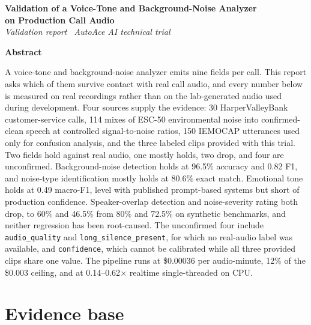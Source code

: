 \documentclass[11pt]{article}
\begin{document}
\begin{center}
{\LARGE\bfseries Validation of a Voice-Tone and Background-Noise Analyzer\\[3pt] on Production Call Audio}\\[7pt]
{\small\itshape\color{ink} Validation report \textperiodcentered\ AutoAce AI technical trial}
\end{center}
\vspace{2pt}
\noindent{\color{linecol}\rule{\textwidth}{0.6pt}}
\vspace{4pt}

\begin{center}\small\bfseries Abstract\end{center}
\small
\noindent\hspace{1.5em}A voice-tone and background-noise analyzer emits nine fields per call. This report asks which of them survive contact with real call audio, and every number below is measured on real recordings rather than on the lab-generated audio used during development. Four sources supply the evidence: 30 HarperValleyBank customer-service calls, 114 mixes of ESC-50 environmental noise into confirmed-clean speech at controlled signal-to-noise ratios, 150 IEMOCAP utterances used only for confusion analysis, and the three labeled clips provided with this trial. Two fields hold against real audio, one mostly holds, two drop, and four are unconfirmed. Background-noise detection holds at 96.5\% accuracy and 0.82 F1, and noise-type identification mostly holds at 80.6\% exact match. Emotional tone holds at 0.49 macro-F1, level with published prompt-based systems but short of production confidence. Speaker-overlap detection and noise-severity rating both drop, to 60\% and 46.5\% from 80\% and 72.5\% on synthetic benchmarks, and neither regression has been root-caused. The unconfirmed four include \texttt{audio\_quality} and \texttt{long\_\allowbreak silence\_\allowbreak present}, for which no real-audio label was available, and \texttt{confidence}, which cannot be calibrated while all three provided clips share one value. The pipeline runs at \$0.00036 per audio-minute, 12\% of the \$0.003 ceiling, and at 0.14--0.62$\times$ realtime single-threaded on CPU.
\normalsize

\noindent{\color{linecol}\rule{\textwidth}{0.4pt}}

\section{Evidence base}
\end{document}
